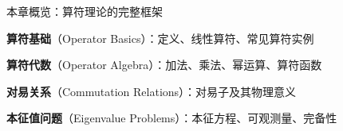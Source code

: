 \documentclass[aspectratio=169, 10pt]{beamer}
\author{东山月光下QM小组}
\date{\today}
\begin{document}
\iqbcoverframe

\begin{frame}{本章概览：算符理论的完整框架}
  \begin{iqbitemize}
    \item \textbf{算符基础}（Operator Basics）：定义、线性算符、常见算符实例
    \item \textbf{算符代数}（Operator Algebra）：加法、乘法、幂运算、算符函数
    \item \textbf{对易关系}（Commutation Relations）：对易子及其物理意义
    \item \textbf{本征值问题}（Eigenvalue Problems）：本征方程、可观测量、完备性
  \end{iqbitemize}

  \iqbbigsep

\end{frame}

\end{document}
